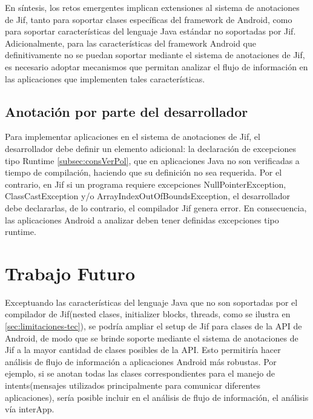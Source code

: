 En síntesis, los retos emergentes implican extensiones al sistema de
anotaciones de Jif, tanto para soportar clases específicas del framework de
Android, como para soportar características del lenguaje Java estándar no
soportadas por Jif.\newline
Adicionalmente, para las características del framework Android que
definitivamente no se puedan soportar mediante el sistema de anotaciones de Jif,
es necesario adoptar mecanismos que permitan analizar el flujo de información en
las aplicaciones que implementen tales características.\newline

\subsection{Anotación por parte del desarrollador}
\label{subsec:cambios}
Para implementar aplicaciones en el sistema de anotaciones de Jif, el
desarrollador debe definir un elemento adicional: la declaración de
excepciones tipo Runtime \ref{subsec:consVerPol}, que en aplicaciones Java no
son verificadas a tiempo de compilación, haciendo que su definición no sea requerida. 
Por el contrario, en Jif si un programa requiere excepciones
NullPointerException, ClassCastException y/o ArrayIndexOutOfBoundsException, el
desarrollador debe declararlas, de lo contrario, el compilador Jif genera
error.
En consecuencia, las aplicaciones Android a analizar deben tener definidas
excepciones tipo runtime.

\section{Trabajo Futuro}
\label{sec:tf}

Exceptuando las características del lenguaje Java que no son soportadas por el
compilador de Jif(nested clases, initializer blocks, threads, como se ilustra en
 \ref{sec:limitaciones-tec}), se podría ampliar el setup de Jif para clases de
 la API de Android, de modo que se brinde soporte mediante el sistema de anotaciones de
Jif a la mayor cantidad de clases posibles de la API.
Esto permitiría hacer análisis de flujo de información a aplicaciones
Android más robustas. Por ejemplo, si se anotan todas las clases
correspondientes para el manejo de intents(mensajes utilizados principalmente
para comunicar diferentes aplicaciones), sería posible incluir en el análisis de
flujo de información, el análisis vía interApp.\newline


